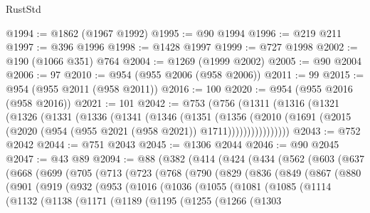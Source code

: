 \begin{lexlean}{RustStd}
\begin{coremodule}
@1994 := @1862 (@1967 @1992)
@1995 := @90 @1994
@1996 := @219 @211
@1997 := @396 @1996
@1998 := @1428 @1997
@1999 := @727 @1998
@2002 := @190 (@1066 @351) @764
@2004 := @1269 (@1999 @2002)
@2005 := @90 @2004
@2006 := 97
@2010 := @954 (@955 @2006 (@958 @2006))
@2011 := 99
@2015 := @954 (@955 @2011 (@958 @2011))
@2016 := 100
@2020 := @954 (@955 @2016 (@958 @2016))
@2021 := 101
@2042 := @753
    (@756
      (@1311
        (@1316
          (@1321
            (@1326
              (@1331
                (@1336
                  (@1341
                    (@1346
                      (@1351
                        (@1356
                          (@2010
                            (@1691
                              (@2015 (@2020 (@954 (@955 @2021 (@958 @2021)) @1711))))))))))))))))
@2043 := @752 @2042
@2044 := @751 @2043
@2045 := @1306 @2044
@2046 := @90 @2045
@2047 := @43 @89
@2094 := @88
    (@382
      (@414
        (@424
          (@434
            (@562
              (@603
                (@637
                  (@668
                    (@699
                      (@705
                        (@713
                          (@723
                            (@768
                              (@790
                                (@829
                                  (@836
                                    (@849
                                      (@867
                                        (@880
                                          (@901
                                            (@919
                                              (@932
                                                (@953
                                                  (@1016
                                                    (@1036
                                                      (@1055
                                                        (@1081
                                                          (@1085
                                                            (@1114
                                                              (@1132
                                                                (@1138
                                                                  (@1171
                                                                    (@1189
                                                                      (@1195
                                                                        (@1255
                                                                          (@1266
                                                                            (@1303

\end{coremodule}
\end{lexlean}
